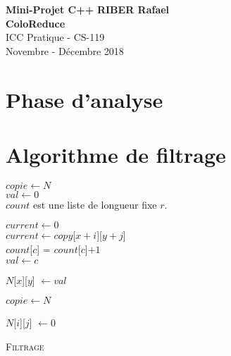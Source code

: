 \documentclass[a4paper, 11pt]{article}
\begin{document}
\noindent
\large\textbf{Mini-Projet C++} \hfill \textbf{RIBER Rafael} \\
\large\textbf{ColoReduce}\\
\normalsize ICC Pratique - CS-119\\
\hfill Novembre - Décembre 2018

\section*{Phase d'analyse}

\section*{Algorithme de filtrage}

\begin{algorithm}[H]
\SetSideCommentLeft
    $copie \gets N$\\
    $val \gets 0$\\
    $count$ est une liste de longueur fixe $r$.
    
      {
      	  {
      	    {
    			$current \gets 0$\\
   				  {
   				  	  {
   				  	  	  {
   				  	  	    $current \gets copy$[$x + i$][$y + j$]\\
   				  	  	  	  {
   				  	  	  	  		{
   				  	  	  	  			$count$[$c$] = $count$[$c$]$ + 1$\\
   				  	  	  	  			  {
   				  	  	  	  			    $val \gets c$
   				  	  	  	  			  }
   				  	  	  	  		}
   				  	  	  	  }
   				  	  	  }
   				  	  }
   				  }
   			 
             $N$[$x$][$y$] $\gets val$
      	    }
      	  }
      	  $copie \gets N$
        }
          {
        	{
        	  {
                  {
                    $N$[$i$][$j$] $\gets 0$
                  }
              }
            }
        }
\caption{ \textsc{Filtrage}}
\end{algorithm}
\end{document}
